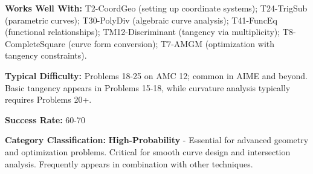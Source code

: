 \documentclass[12pt]{article}
\begin{document}
\textbf{Works Well With:} T2-CoordGeo (setting up coordinate systems); T24-TrigSub (parametric curves); T30-PolyDiv (algebraic curve analysis); T41-FuncEq (functional relationships); TM12-Discriminant (tangency via multiplicity); T8-CompleteSquare (curve form conversion); T7-AMGM (optimization with tangency constraints).

\textbf{Typical Difficulty:} Problems 18-25 on AMC 12; common in AIME and beyond. Basic tangency appears in Problems 15-18, while curvature analysis typically requires Problems 20+.

\textbf{Success Rate:} 60-70%

\textbf{Category Classification:} \textbf{High-Probability} - Essential for advanced geometry and optimization problems. Critical for smooth curve design and intersection analysis. Frequently appears in combination with other techniques.
\end{document}
